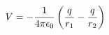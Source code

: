 \documentclass[preview]{standalone}
\begin{document}
\begin{align*}
V  =  - {1  \over   4\pi\epsilon_0}  \left( \frac{q}{r_1} - \frac{q}{r_2} \right)
\end{align*}
\end{document}
